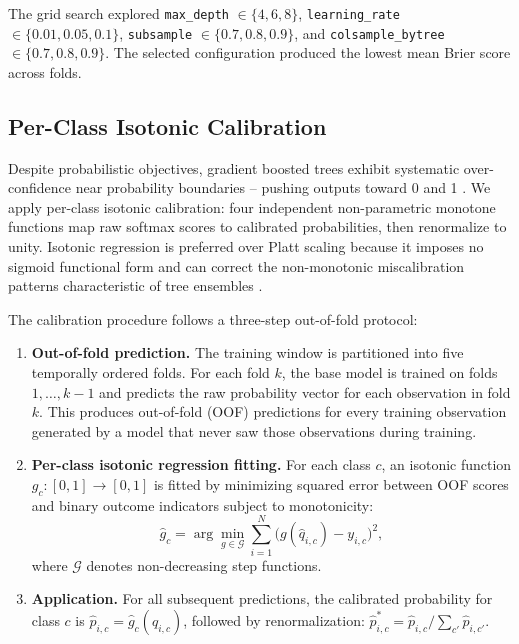 \documentclass[12pt,a4paper]{article}
\begin{document}
The grid search explored \texttt{max\_depth} $\in \{4, 6, 8\}$, \texttt{learning\_rate} $\in \{0.01, 0.05, 0.1\}$, \texttt{subsample} $\in \{0.7, 0.8, 0.9\}$, and \texttt{colsample\_bytree} $\in \{0.7, 0.8, 0.9\}$. The selected configuration produced the lowest mean Brier score across folds.

\subsection{Per-Class Isotonic Calibration}

Despite probabilistic objectives, gradient boosted trees exhibit systematic over-confidence near probability boundaries -- pushing outputs toward 0 and 1 \citep{niculescumizil2005probabilities}. We apply per-class isotonic calibration: four independent non-parametric monotone functions map raw softmax scores to calibrated probabilities, then renormalize to unity. Isotonic regression is preferred over Platt scaling because it imposes no sigmoid functional form and can correct the non-monotonic miscalibration patterns characteristic of tree ensembles \citep{zadrozny2002transforming}.

The calibration procedure follows a three-step out-of-fold protocol:

\begin{enumerate}
  \item \textbf{Out-of-fold prediction.} The training window is partitioned into five temporally ordered folds. For each fold $k$, the base model is trained on folds $1, \ldots, k-1$ and predicts the raw probability vector for each observation in fold $k$. This produces out-of-fold (OOF) predictions for every training observation generated by a model that never saw those observations during training.

  \item \textbf{Per-class isotonic regression fitting.} For each class $c$, an isotonic function $g_c : [0,1] \to [0,1]$ is fitted by minimizing squared error between OOF scores and binary outcome indicators subject to monotonicity:
  \begin{equation}
    \hat{g}_c = \arg\min_{g \in \mathcal{G}} \sum_{i=1}^{N}
              \bigl(g(\hat{q}_{i,c}) - y_{i,c}\bigr)^2,
  \end{equation}
  where $\mathcal{G}$ denotes non-decreasing step functions.

  \item \textbf{Application.} For all subsequent predictions, the calibrated probability for class $c$ is $\hat{p}_{i,c} = \hat{g}_c(\hat{q}_{i,c})$, followed by renormalization: $\hat{p}_{i,c}^{*} = \hat{p}_{i,c} / \sum_{c'} \hat{p}_{i,c'}$.
\end{enumerate}
\end{document}
